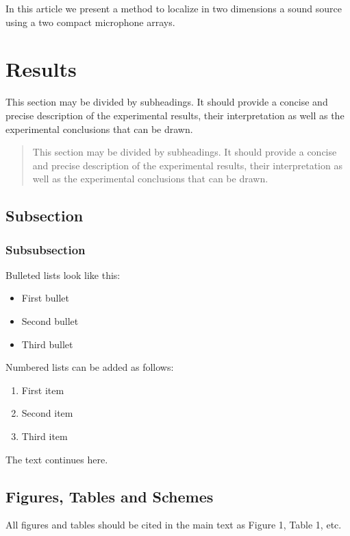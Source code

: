 \documentclass[applsci,article,submit,moreauthors,pdftex]{Definitions/mdpi}
\begin{document}
In this article we present a method to localize in two dimensions a sound source using a two compact microphone arrays. 

 
\section{Results}

This section may be divided by subheadings. It should provide a concise and precise description of the experimental results, their interpretation as well as the experimental conclusions that can be drawn.
\begin{quote}
This section may be divided by subheadings. It should provide a concise and precise description of the experimental results, their interpretation as well as the experimental conclusions that can be drawn.
\end{quote}

\subsection{Subsection}
\unskip
\subsubsection{Subsubsection}

Bulleted lists look like this:
\begin{itemize}[leftmargin=*,labelsep=5.8mm]
\item	First bullet
\item	Second bullet
\item	Third bullet
\end{itemize}

Numbered lists can be added as follows:
\begin{enumerate}[leftmargin=*,labelsep=4.9mm]
\item	First item 
\item	Second item
\item	Third item
\end{enumerate}

The text continues here.

\subsection{Figures, Tables and Schemes}

All figures and tables should be cited in the main text as Figure 1, Table 1, etc.
\end{document}
